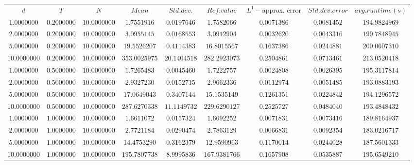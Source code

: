 \begin{tabular}{ccccccccc}
$d$ & $T$ & $N$ & $Mean$ & $Std. dev.$ & $Ref. value$ & $L^1-$approx. error & $Std. dev. error$ & $avg. runtime (s)$\\
$1.0000000$ & $0.2000000$ & $10.0000000$ & $1.7551916$ & $0.0197646$ & $1.7582066$ & $0.0071386$ & $0.0081452$ & $194.9824969$\\
$2.0000000$ & $0.2000000$ & $10.0000000$ & $3.0955145$ & $0.0168553$ & $3.0912904$ & $0.0032620$ & $0.0043316$ & $199.7848945$\\
$5.0000000$ & $0.2000000$ & $10.0000000$ & $19.5526207$ & $0.4114383$ & $16.8015567$ & $0.1637386$ & $0.0244881$ & $200.0607310$\\
$10.0000000$ & $0.2000000$ & $10.0000000$ & $353.0025975$ & $20.1404518$ & $282.2923073$ & $0.2504861$ & $0.0713461$ & $213.0520418$\\
$1.0000000$ & $0.5000000$ & $10.0000000$ & $1.7265483$ & $0.0045460$ & $1.7222757$ & $0.0024808$ & $0.0026395$ & $195.3117814$\\
$2.0000000$ & $0.5000000$ & $10.0000000$ & $2.9327230$ & $0.0152715$ & $2.9662336$ & $0.0112974$ & $0.0051485$ & $193.0883193$\\
$5.0000000$ & $0.5000000$ & $10.0000000$ & $17.0649043$ & $0.3407144$ & $15.1535149$ & $0.1261351$ & $0.0224842$ & $194.1296572$\\
$10.0000000$ & $0.5000000$ & $10.0000000$ & $287.6270338$ & $11.1149732$ & $229.6290127$ & $0.2525727$ & $0.0484040$ & $193.4848432$\\
$1.0000000$ & $1.0000000$ & $10.0000000$ & $1.6611072$ & $0.0157324$ & $1.6692252$ & $0.0071831$ & $0.0073416$ & $189.8164937$\\
$2.0000000$ & $1.0000000$ & $10.0000000$ & $2.7721184$ & $0.0290474$ & $2.7863129$ & $0.0066831$ & $0.0092354$ & $183.0216717$\\
$5.0000000$ & $1.0000000$ & $10.0000000$ & $14.4753290$ & $0.3162379$ & $12.9590963$ & $0.1170014$ & $0.0244028$ & $187.5601333$\\
$10.0000000$ & $1.0000000$ & $10.0000000$ & $195.7807738$ & $8.9995836$ & $167.9381766$ & $0.1657908$ & $0.0535887$ & $195.6549210$\\
\end{tabular}
